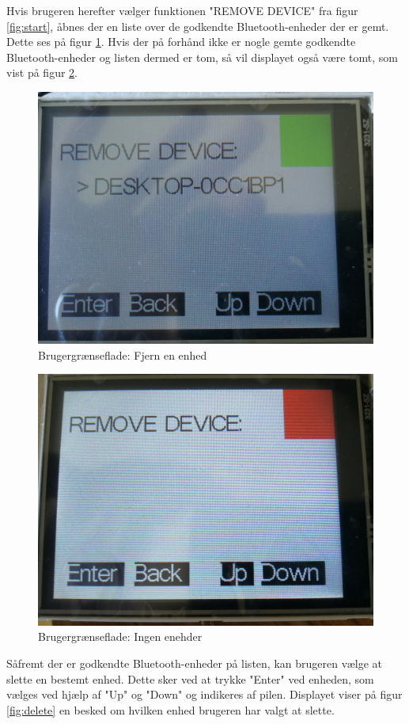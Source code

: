 Hvis brugeren herefter vælger funktionen "REMOVE DEVICE" fra figur \ref{fig:start}, åbnes der en liste over de godkendte Bluetooth-enheder der er gemt. Dette ses på figur \ref{fig:remove}. Hvis der på forhånd ikke er nogle gemte godkendte Bluetooth-enheder og listen dermed er tom, så vil displayet også være tomt, som vist på figur \ref{fig:noDevices}. 
\begin{figure}[H]
	\centering
	\includegraphics[width = 300 pt]{Img/remove.jpg}
	\caption{Brugergrænseflade: Fjern en enhed}
	\label{fig:remove}
\end{figure}
\begin{figure}[H]
	\centering
	\includegraphics[width = 300 pt]{Img/noDevice.jpg}
	\caption{Brugergrænseflade: Ingen enehder}
	\label{fig:noDevices}
\end{figure}
Såfremt der er godkendte Bluetooth-enheder på listen, kan brugeren vælge at slette en bestemt enhed. Dette sker ved at trykke "Enter" ved enheden, som vælges ved hjælp af "Up" og "Down" og indikeres af pilen. Displayet viser på figur \ref{fig:delete} en besked om hvilken enhed brugeren har valgt at slette. 
